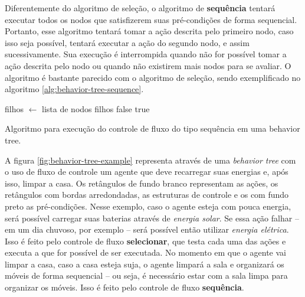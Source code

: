 Diferentemente do algoritmo de seleção, o algoritmo de \textbf{sequência}
tentará executar todos os nodos que satisfizerem suas pré-condições de forma
sequencial. Portanto, esse algoritmo tentará tomar a ação descrita pelo primeiro
nodo, caso isso seja possível, tentará executar a ação do segundo nodo, e assim
sucessivamente. Sua execução é interrompida quando não for possível tomar a ação
descrita pelo nodo ou quando não existirem mais nodos para se avaliar. O
algoritmo é bastante parecido com o algoritmo de seleção, sendo exemplificado no
algoritmo \ref{alg:behavior-tree-sequence}.

\begin{algorithm}[H]
\begin{center}
	\begin{algorithmic}[1]
        \STATE filhos $\gets$ lista de nodos filhos
                \RETURN false
            \ENDIF
        \ENDFOR
        \RETURN true
    \end{algorithmic}
\end{center}
\caption[Algoritmo para execução do controle de fluxo do tipo sequência em uma
behavior tree.]
{\label{alg:behavior-tree-sequence} Algoritmo para execução do controle de fluxo
do tipo sequência em uma behavior tree.}
\end{algorithm}

A figura \ref{fig:behavior-tree-example} representa através de uma
\textit{behavior tree} com o uso de fluxo de controle um agente que deve
recarregar suas energias e, após isso, limpar a casa. Os retângulos de fundo
branco representam as ações, os retângulos com bordas arredondadas, as
estruturas de controle e os com fundo preto as pré-condições. Nesse exemplo,
caso o agente esteja com pouca energia, será possível carregar suas baterias
através de \textit{energia solar}. Se essa ação falhar -- em um dia chuvoso, por
exemplo -- será possível então utilizar \textit{energia elétrica}. Isso é feito
pelo controle de fluxo \textbf{selecionar}, que testa cada uma das ações e
executa a que for possível de ser executada.  No momento em que o agente vai
limpar a casa, caso a casa esteja suja, o agente limpará a sala e organizará os
móveis de forma sequencial -- ou seja, é necessário estar com a sala limpa para
organizar os móveis. Isso é feito pelo controle de fluxo \textbf{sequência}.

